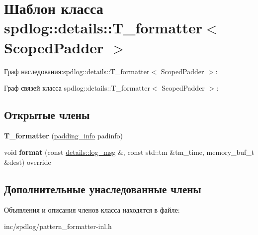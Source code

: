 \hypertarget{classspdlog_1_1details_1_1T__formatter}{}\section{Шаблон класса spdlog\+:\+:details\+:\+:T\+\_\+formatter$<$ Scoped\+Padder $>$}
\label{classspdlog_1_1details_1_1T__formatter}


Граф наследования\+:spdlog\+:\+:details\+:\+:T\+\_\+formatter$<$ Scoped\+Padder $>$\+:


Граф связей класса spdlog\+:\+:details\+:\+:T\+\_\+formatter$<$ Scoped\+Padder $>$\+:
\subsection*{Открытые члены}
\begin{DoxyCompactItemize}
\item 
\mbox{\label{classspdlog_1_1details_1_1T__formatter_ad35d83b6e45180223912181dc209eec0}} 
{\bfseries T\+\_\+formatter} (\hyperlink{structspdlog_1_1details_1_1padding__info}{padding\+\_\+info} padinfo)
\item 
\mbox{\label{classspdlog_1_1details_1_1T__formatter_af1a8d22f82b0edc69b737fb5b61980b2}} 
void {\bfseries format} (const \hyperlink{structspdlog_1_1details_1_1log__msg}{details\+::log\+\_\+msg} \&, const std\+::tm \&tm\+\_\+time, memory\+\_\+buf\+\_\+t \&dest) override
\end{DoxyCompactItemize}
\subsection*{Дополнительные унаследованные члены}


Объявления и описания членов класса находятся в файле\+:\begin{DoxyCompactItemize}
\item 
inc/spdlog/pattern\+\_\+formatter-\/inl.\+h\end{DoxyCompactItemize}
